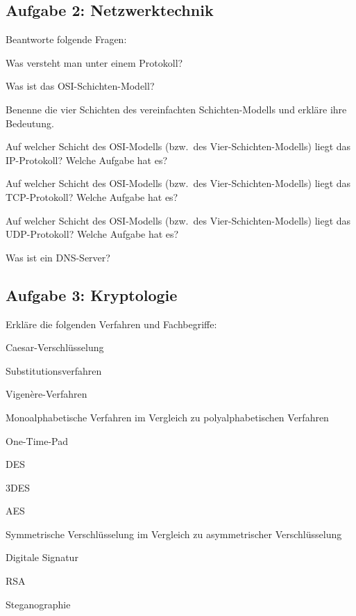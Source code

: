 \subsection{Aufgabe 2: Netzwerktechnik}

Beantworte folgende Fragen:

\begin{compactenum}
\item Was versteht man unter einem Protokoll?
\item Was ist das OSI-Schichten-Modell?
\item Benenne die vier Schichten des vereinfachten Schichten-Modells und erkläre
 ihre Bedeutung.
\item Auf welcher Schicht des OSI-Modells (bzw.\ des Vier-Schichten-Modells)
liegt das IP-Protokoll? Welche Aufgabe hat es?
\item Auf welcher Schicht des OSI-Modells (bzw.\ des Vier-Schichten-Modells)
liegt das TCP-Protokoll? Welche Aufgabe hat es?
\item Auf welcher Schicht des OSI-Modells (bzw.\ des Vier-Schichten-Modells)
liegt das UDP-Protokoll? Welche Aufgabe hat es?
\item Was ist ein DNS-Server?
\end{compactenum}

\subsection{Aufgabe 3: Kryptologie}

Erkläre die folgenden Verfahren und Fachbegriffe:

\begin{compactenum}
\item Caesar-Verschlüsselung
\item Substitutionsverfahren
\item Vigenère-Verfahren
\item Monoalphabetische Verfahren im Vergleich zu polyalphabetischen Verfahren
\item One-Time-Pad
\item DES
\item 3DES
\item AES
\item Symmetrische Verschlüsselung im Vergleich zu asymmetrischer
Verschlüsselung
\item Digitale Signatur
\item RSA
\item Steganographie
\end{compactenum}


